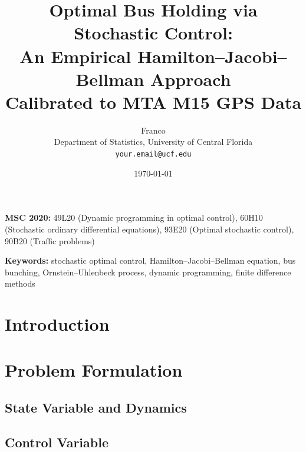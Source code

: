 \documentclass[11pt]{article}
\title{
  \textbf{Optimal Bus Holding via Stochastic Control:} \\
  \textbf{An Empirical Hamilton--Jacobi--Bellman Approach} \\[0.5em]
  \large Calibrated to MTA M15 GPS Data
}
\author{
  Franco \\[0.3em]
  \small Department of Statistics, University of Central Florida \\
  \small \texttt{your.email@ucf.edu}
}
\date{\today}
\theoremstyle{plain}
\theoremstyle{definition}
\theoremstyle{remark}
\begin{document}
\maketitle

\vspace{-0.5em}
\noindent\textbf{MSC 2020:}
49L20 (Dynamic programming in optimal control),
60H10 (Stochastic ordinary differential equations),
93E20 (Optimal stochastic control),
90B20 (Traffic problems)

\medskip
\noindent\textbf{Keywords:}
stochastic optimal control,
Hamilton--Jacobi--Bellman equation,
bus bunching,
Ornstein--Uhlenbeck process,
dynamic programming,
finite difference methods

\bigskip

\begin{abstract}
\end{abstract}

\tableofcontents
\newpage

\section{Introduction}
\label{sec:intro}


\section{Problem Formulation}
\label{sec:formulation}

\subsection{State Variable and Dynamics}
\label{sec:dynamics}

\subsection{Control Variable}
\label{sec:control}
\end{document}
